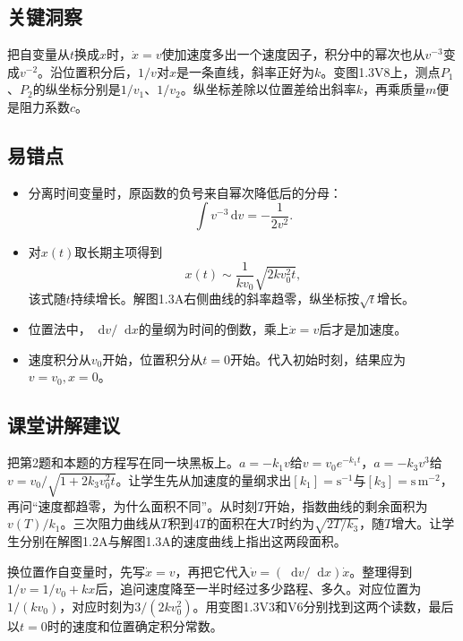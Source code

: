 \documentclass[UTF8,fontset=fandol,a4paper,11pt]{ctexart}
\newcommand{\dd}{\mathop{}\!\mathrm{d}}
\begin{document}


\subsection*{关键洞察}

把自变量从$t$换成$x$时，$\dot x=v$使加速度多出一个速度因子，积分中的幂次也从$v^{-3}$变成$v^{-2}$。沿位置积分后，$1/v$对$x$是一条直线，斜率正好为$k$。变图1.3V8上，测点$P_1$、$P_2$的纵坐标分别是$1/v_1$、$1/v_2$。纵坐标差除以位置差给出斜率$k$，再乘质量$m$便是阻力系数$c$。



\subsection*{易错点}

\begin{itemize}
\item 分离时间变量时，原函数的负号来自幂次降低后的分母：
\[
\int v^{-3}\,\mathrm{d}v=-\frac{1}{2v^2}.
\]
\item 对$x(t)$取长期主项得到
\[
x(t)\sim \frac{1}{kv_0}\sqrt{2kv_0^2t},
\]
该式随$t$持续增长。解图1.3A右侧曲线的斜率趋零，纵坐标按$\sqrt t$增长。
\item 位置法中，$\dd v/\dd x$的量纲为时间的倒数，乘上$\dot x=v$后才是加速度。
\item 速度积分从$v_0$开始，位置积分从$t=0$开始。代入初始时刻，结果应为$v=v_0,x=0$。
\end{itemize}



\subsection*{课堂讲解建议}

把第2题和本题的方程写在同一块黑板上。$a=-k_1v$给$v=v_0e^{-k_1t}$，$a=-k_3v^3$给$v=v_0/\sqrt{1+2k_3v_0^2t}$。让学生先从加速度的量纲求出$[k_1]=\mathrm{s^{-1}}$与$[k_3]=\mathrm{s\,m^{-2}}$，再问“速度都趋零，为什么面积不同”。从时刻$T$开始，指数曲线的剩余面积为$v(T)/k_1$。三次阻力曲线从$T$积到$4T$的面积在大$T$时约为$\sqrt{2T/k_3}$，随$T$增大。让学生分别在解图1.2A与解图1.3A的速度曲线上指出这两段面积。

换位置作自变量时，先写$\dot x=v$，再把它代入$\dot v=(\dd v/\dd x)\dot x$。整理得到$1/v=1/v_0+kx$后，追问速度降至一半时经过多少路程、多久。对应位置为$1/(kv_0)$，对应时刻为$3/(2kv_0^2)$。用变图1.3V3和V6分别找到这两个读数，最后以$t=0$时的速度和位置确定积分常数。
\end{document}
